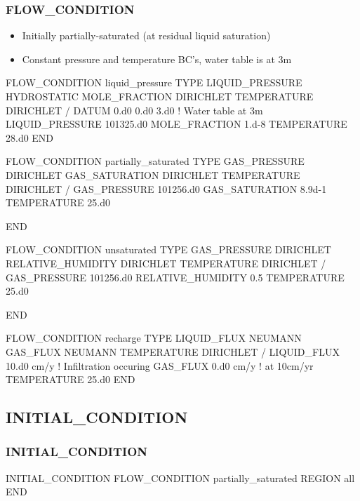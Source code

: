 \documentclass{beamer}
\newcommand\bluecomment[1]{{{\color{blue} #1}}}
\begin{document}
\begin{frame}\frametitle{FLOW\_CONDITION}

\begin{itemize}
\item Initially partially-saturated (at residual liquid saturation)
\item Constant pressure and temperature BC's, water table is at 3m
\end{itemize}

\begin{semiverbatim}
FLOW_CONDITION liquid_pressure
  TYPE
    LIQUID_PRESSURE HYDROSTATIC
    MOLE_FRACTION DIRICHLET
    TEMPERATURE DIRICHLET
  /
  DATUM 0.d0 0.d0 3.d0 \bluecomment{! Water table at 3m}
  LIQUID_PRESSURE 101325.d0
  MOLE_FRACTION 1.d-8
  TEMPERATURE 28.d0
END

\newpage
FLOW_CONDITION partially_saturated
  TYPE
    GAS_PRESSURE DIRICHLET
    GAS_SATURATION DIRICHLET
    TEMPERATURE DIRICHLET
  /
  GAS_PRESSURE 101256.d0
  GAS_SATURATION 8.9d-1 
  TEMPERATURE 25.d0

END

\newpage
FLOW_CONDITION unsaturated
  TYPE
    GAS_PRESSURE DIRICHLET
    RELATIVE_HUMIDITY DIRICHLET
    TEMPERATURE DIRICHLET
  /
  GAS_PRESSURE 101256.d0
  RELATIVE_HUMIDITY 0.5
  TEMPERATURE 25.d0

END

FLOW_CONDITION recharge
  TYPE
    LIQUID_FLUX NEUMANN
    GAS_FLUX NEUMANN
    TEMPERATURE DIRICHLET
  /
  LIQUID_FLUX 10.d0 cm/y \bluecomment{! Infiltration occuring}
  GAS_FLUX 0.d0 cm/y     \bluecomment{! at 10cm/yr}
  TEMPERATURE 25.d0
END

\end{semiverbatim}

\end{frame}

\subsection{INITIAL\_CONDITION}

\begin{frame}[fragile]\frametitle{INITIAL\_CONDITION}

\begin{semiverbatim}
INITIAL_CONDITION
  FLOW_CONDITION partially_saturated 
  REGION all
END
\end{semiverbatim}

\end{frame}
\end{document}
